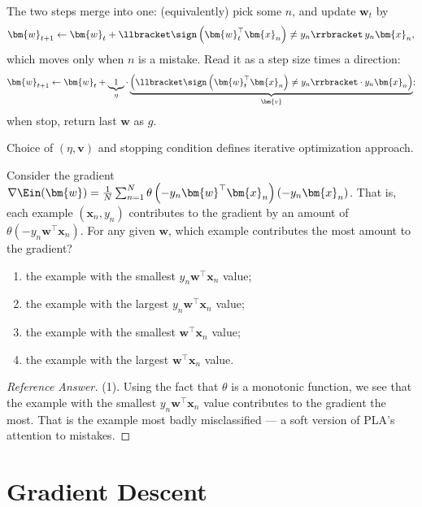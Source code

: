 The two steps merge into one: (equivalently) pick some \(n\), and update
\(\bm{w}_t\) by
\[
    \bm{w}_{t+1} \gets \bm{w}_t + \llbracket \sign \left( \bm{w}_t^\top
    \bm{x}_n \right) \neq y_n \rrbracket \, y_n \bm{x}_n ,
\]
which moves only when \(n\) is a mistake. Read it as a step size times a
direction:
\[
    \bm{w}_{t+1} \gets \bm{w}_t + \underbrace{1}_{\eta} \cdot
    \underbrace{\left( \llbracket \sign \left( \bm{w}_t^\top \bm{x}_n
    \right) \neq y_n \rrbracket \cdot y_n \bm{x}_n \right)}_{\bm{v}} ;
\]
when stop, return last \(\bm{w}\) as \(g\).

\begin{moral}
    Choice of \((\eta, \bm{v})\) and stopping condition defines
    \textcolor{orange!85!black}{iterative optimization approach}.
\end{moral}

\begin{exercise}
    Consider the gradient \(\nabla \Ein(\bm{w}) = \frac{1}{N} \sum_{n=1}^N
    \theta \left( -y_n \bm{w}^\top \bm{x}_n \right) \left( -y_n \bm{x}_n
    \right)\). That is, each example \((\bm{x}_n, y_n)\) contributes to the
    gradient by an amount of \(\theta \left( -y_n \bm{w}^\top \bm{x}_n
    \right)\). For any given \(\bm{w}\), which example contributes the most
    amount to the gradient?
    \begin{enumerate}[(1)]
        \item the example with the smallest \(y_n \bm{w}^\top \bm{x}_n\)
            value;
        \item the example with the largest \(y_n \bm{w}^\top \bm{x}_n\) value;
        \item the example with the smallest \(\bm{w}^\top \bm{x}_n\) value;
        \item the example with the largest \(\bm{w}^\top \bm{x}_n\) value.
    \end{enumerate}
\end{exercise}

\begin{proof}[Reference Answer]
    (1). Using the fact that \(\theta\) is a monotonic function, we see that
    the example with the smallest \(y_n \bm{w}^\top \bm{x}_n\) value
    contributes to the gradient the most. That is the example most badly
    misclassified --- a soft version of PLA's attention to mistakes.
\end{proof}

\section{Gradient Descent}\label{sec:gd}

